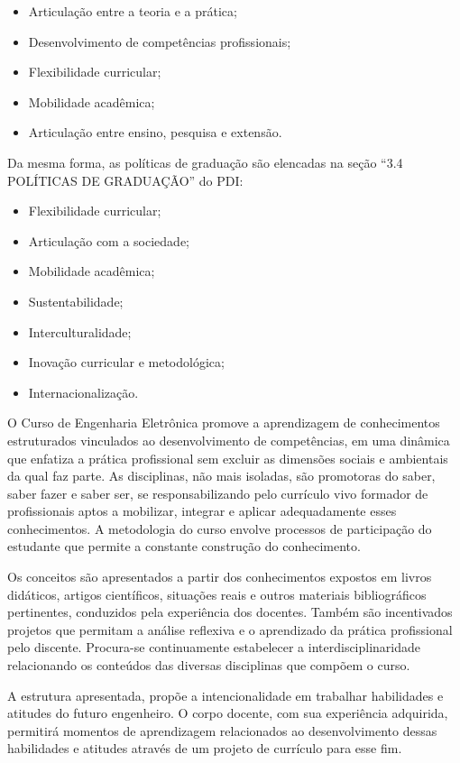 \begin{itemize}
	\item Articulação entre a teoria e a prática;
	\item Desenvolvimento de competências profissionais;
	\item Flexibilidade curricular;
	\item Mobilidade acadêmica;
	\item Articulação entre ensino, pesquisa e extensão.
\end{itemize}

Da mesma forma, as políticas de graduação são elencadas na seção ``3.4 POLÍTICAS DE GRADUAÇÃO'' do PDI:

\begin{itemize}
	\item Flexibilidade curricular;
	\item Articulação com a sociedade;
	\item Mobilidade acadêmica;
	\item Sustentabilidade;
	\item Interculturalidade;
	\item Inovação curricular e metodológica;
	\item Internacionalização.
\end{itemize}

O Curso de Engenharia Eletrônica promove a aprendizagem de conhecimentos estruturados vinculados ao desenvolvimento de competências, em uma dinâmica que enfatiza a prática profissional sem excluir as dimensões sociais e ambientais da qual faz parte. As disciplinas, não mais isoladas, são promotoras do saber, saber fazer e saber ser, se responsabilizando pelo currículo vivo formador de profissionais aptos a mobilizar, integrar e aplicar adequadamente esses conhecimentos. A metodologia do curso envolve processos de participação do estudante que permite a constante construção do conhecimento.

Os conceitos são apresentados a partir dos conhecimentos expostos em livros didáticos, artigos científicos, situações reais e outros materiais bibliográficos pertinentes, conduzidos pela experiência dos docentes. Também são incentivados projetos que permitam a análise reflexiva e o aprendizado da prática profissional pelo discente. Procura-se continuamente estabelecer a interdisciplinaridade relacionando os conteúdos das diversas disciplinas que compõem o curso.

A estrutura apresentada, propõe a intencionalidade em trabalhar habilidades e atitudes do futuro engenheiro. O corpo docente, com sua experiência adquirida, permitirá momentos de aprendizagem relacionados ao desenvolvimento dessas habilidades e atitudes através de um projeto de currículo para esse fim.

